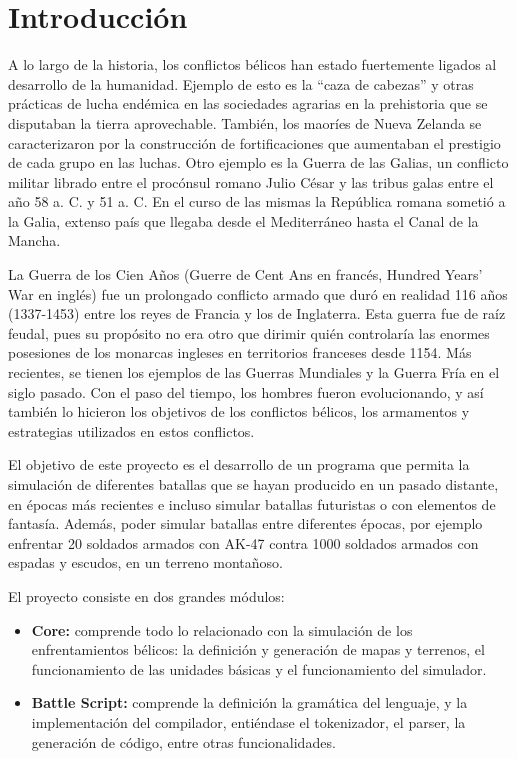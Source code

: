 \section{Introducción}

A lo largo de la historia, los conflictos bélicos han estado fuertemente ligados al desarrollo de la humanidad. Ejemplo de esto es la ``caza de cabezas'' y otras prácticas de lucha endémica en las sociedades agrarias en la prehistoria que se disputaban la tierra aprovechable. También, los maoríes de Nueva Zelanda se caracterizaron por la construcción de fortificaciones que aumentaban el prestigio de cada grupo en las luchas. Otro ejemplo es la Guerra de las Galias, un conflicto militar librado entre el procónsul romano Julio César y las tribus galas entre el año 58 a. C. y 51 a. C. En el curso de las mismas la República romana sometió a la Galia, extenso país que llegaba desde el Mediterráneo hasta el Canal de la Mancha. 

La Guerra de los Cien Años (Guerre de Cent Ans en francés, Hundred Years' War en inglés) fue un prolongado conflicto armado que duró en realidad 116 años (1337-1453) entre los reyes de Francia y los de Inglaterra. Esta guerra fue de raíz feudal, pues su propósito no era otro que dirimir quién controlaría las enormes posesiones de los monarcas ingleses en territorios franceses desde 1154. Más recientes, se tienen los ejemplos de las Guerras Mundiales y la Guerra Fría en el siglo pasado. Con el paso del tiempo, los hombres fueron evolucionando, y así también lo hicieron los objetivos de los conflictos bélicos, los armamentos y estrategias utilizados en estos conflictos.

El objetivo de este proyecto es el desarrollo de un programa que permita la simulación de diferentes batallas que se hayan producido en un pasado distante, en épocas más recientes e incluso simular batallas futuristas o con elementos de fantasía. Además, poder simular batallas entre diferentes épocas, por ejemplo enfrentar 20 soldados armados con AK-47 contra 1000 soldados armados con espadas y escudos, en un terreno montañoso.

El proyecto consiste en dos grandes módulos:

\begin{itemize}
    \item \textbf{Core:} comprende todo lo relacionado con la simulación de los enfrentamientos bélicos: la definición y generación de mapas y terrenos, el funcionamiento de las unidades básicas y el funcionamiento del simulador.
    \item \textbf{Battle Script:} comprende la definición la gramática del lenguaje, y la implementación del compilador, entiéndase el tokenizador, el parser, la generación de código, entre otras funcionalidades.
\end{itemize}

